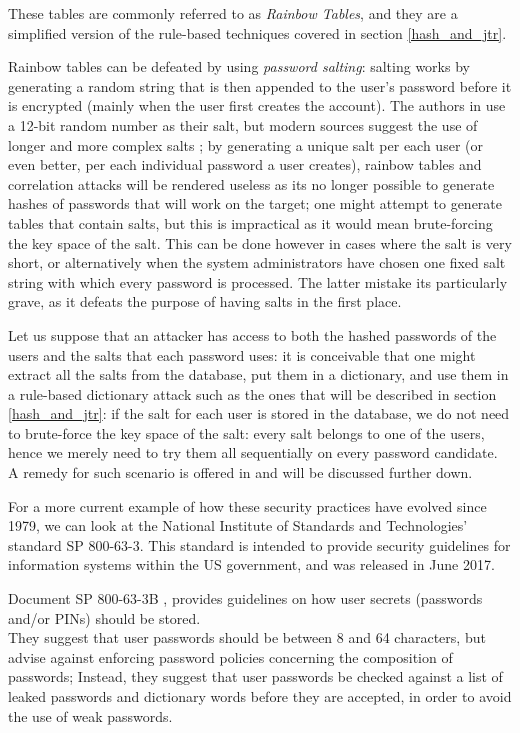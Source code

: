 These tables are commonly referred to as \emph{Rainbow Tables}, and they are a simplified version of the rule-based techniques covered in section \ref{hash_and_jtr}.

Rainbow tables can be defeated by using \emph{password salting}: salting works by generating a random string that is then appended to the user's password before it is encrypted (mainly when the user first creates the account). The authors in \cite{Thompson1979} use a 12-bit random number as their salt, but modern sources suggest the use of longer and more complex salts \cite{NIST_2017}; by generating a unique salt per each user (or even better, per each individual password a user creates), rainbow tables and correlation attacks will be rendered useless as its no longer possible to generate hashes of passwords that will work on the target; one might attempt to generate tables that contain salts, but this is impractical as it would mean brute-forcing the key space of the salt.
This can be done however in cases where the salt is very short, or alternatively when the system administrators have chosen one fixed salt string with which every password is processed.
The latter mistake its particularly grave, as it defeats the purpose of having salts in the first place.
   
Let us suppose that an attacker has access to both the hashed passwords of the users and the salts that each password uses: it is conceivable that one might extract all the salts from the database, put them in a dictionary, and use them in a rule-based dictionary attack such as the ones that will be described in section \ref{hash_and_jtr}: if the salt for each user is stored in the database, we do not need to brute-force the key space of the salt: every salt belongs to one of the users, hence we merely need to try them all sequentially on every password candidate. 
A remedy for such scenario is offered in \cite{NIST_2017} and will be discussed further down. %

For a more current example of how these security practices have evolved since 1979, we can look at the National Institute of Standards and Technologies' standard SP 800-63-3.
This standard is intended to provide security guidelines for information systems within the US government, and was released in June 2017.

Document SP 800-63-3B \cite{NIST_2017}, provides guidelines on how user secrets (passwords and/or PINs) should be stored.\\
They suggest that user passwords should be between 8 and 64 characters, but advise against enforcing password policies concerning the composition of passwords; Instead, they suggest that user passwords be checked against a list of leaked passwords and dictionary words before they are accepted, in order to avoid the use of weak passwords.

